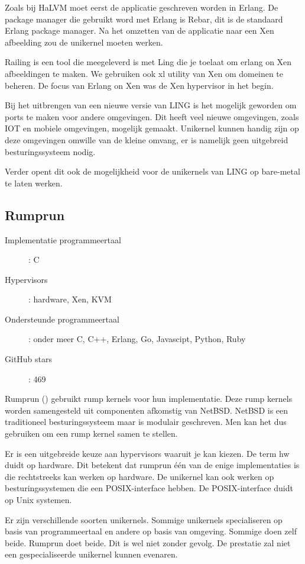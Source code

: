 \documentclass[pdftex,a4paper,12pt,twoside]{report}
\begin{document}
Zoals bij HaLVM moet eerst de applicatie geschreven worden in Erlang. De package manager die gebruikt word met Erlang is Rebar, dit is de standaard Erlang package manager. Na het omzetten van de applicatie naar een Xen afbeelding zou de unikernel moeten werken.

Railing is een tool die meegeleverd is met Ling die je toelaat om erlang on Xen afbeeldingen te maken. We gebruiken ook xl utility van Xen om domeinen te beheren.
De focus van Erlang on Xen was de Xen hypervisor in het begin. 

Bij het uitbrengen van een nieuwe versie van LING is het mogelijk geworden om ports te maken voor andere omgevingen. Dit heeft veel nieuwe omgevingen, zoals IOT en mobiele omgevingen, mogelijk gemaakt.
Unikernel kunnen handig zijn op deze omgevingen omwille van de kleine omvang, er is namelijk geen uitgebreid besturingssysteem nodig. 

Verder opent dit ook de mogelijkheid voor de unikernels van LING op bare-metal te laten werken.

\subsection{Rumprun}

\begin{description}
  \item [Implementatie programmeertaal]: C
  \item [Hypervisors]: hardware, Xen, KVM
  \item [Ondersteunde programmeertaal]: onder meer C, C++, Erlang, Go, Javascipt, Python, Ruby
  \item [GitHub stars]: 469
\end{description}

Rumprun  (\cite{rumpkernel/rumprun_0000}) gebruikt rump kernels voor hun implementatie. Deze rump kernels worden samengesteld uit componenten afkomstig van NetBSD. NetBSD is een traditioneel besturingssysteem maar is modulair geschreven. Men kan het dus gebruiken om een rump kernel samen te stellen.

Er is een uitgebreide keuze aan hypervisors waaruit je kan kiezen. De term hw duidt op hardware. Dit betekent dat rumprun één van de enige implementaties is die rechtstreeks kan werken op hardware. De unikernel kan ook werken op besturingssystemen die een POSIX-interface hebben. De POSIX-interface duidt op Unix systemen.

Er zijn verschillende soorten unikernels. Sommige unikernels specialiseren op basis van programmeertaal en andere op basis van omgeving. Sommige doen zelf beide. Rumprun doet beide. Dit is wel niet zonder gevolg. De prestatie zal niet een gespecialiseerde unikernel kunnen evenaren.
\end{document}
